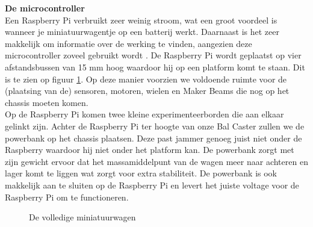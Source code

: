 \documentclass[a4paper,kulak]{kulakarticle}
\begin{document}
\textbf{\large De microcontroller} \\
Een Raspberry Pi verbruikt zeer weinig stroom, wat een groot voordeel is wanneer je miniatuurwagentje op een batterij werkt. Daarnaast is het zeer makkelijk om informatie over de werking te vinden, aangezien deze microcontroller zoveel gebruikt wordt \cite{rasp}.
De Raspberry Pi wordt geplaatst op vier afstandsbussen van 15 mm hoog waardoor hij op een platform komt te staan. Dit is te zien op figuur \ref{fig:afbchassis}. Op deze manier voorzien we voldoende ruimte voor de (plaatsing van de) sensoren, motoren, wielen en Maker Beams die nog op het chassis moeten komen. \\ Op de Raspberry Pi komen twee kleine experimenteerborden die aan elkaar gelinkt zijn. Achter de Raspberry Pi ter hoogte van onze Bal Caster zullen we de powerbank op het chassis plaatsen. Deze past jammer genoeg juist niet onder de Raspberry waardoor hij niet onder het platform kan. De powerbank zorgt met zijn gewicht ervoor dat het massamiddelpunt van de wagen meer naar achteren en lager komt te liggen wat zorgt voor extra stabiliteit. De powerbank is ook makkelijk aan te sluiten op de Raspberry Pi en levert het juiste voltage voor de Raspberry Pi om te functioneren. 

\begin{figure} [h]
	
	\caption{De volledige miniatuurwagen}\label{fig:afbchassis}
\end{figure}
\end{document}
